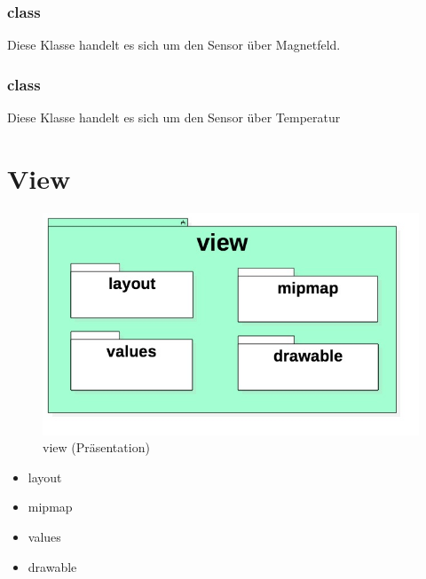 \documentclass[a4paper]{scrreprt}
\begin{document}
                \subsubsection{class }
                Diese Klasse handelt es sich um den Sensor über Magnetfeld.
                \subsubsection{class }
                Diese Klasse handelt es sich um den Sensor über Temperatur

        \newpage
        \section{View}

            \vspace*{1cm}
            \begin{figure}[H]
                \centering
                \includegraphics[scale = 0.7]{view.jpg}
                \caption{view (Präsentation)}
            \end{figure}

            \begin{itemize}
                \item layout \\

                \item mipmap
                \item values
                \item drawable
            \end{itemize}
\end{document}
